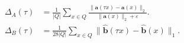 \begin{align}
\Delta_A(\tau)&=\frac{1}{|Q|}\!\sum_{x\in Q}\!\frac{\|\mathbf a(\tau x)-\mathbf a(x)\|_2}{\|\mathbf a(x)\|_2+\varepsilon}.
\tag{9}\label{eq:formal_perturbation_change}\\[1mm]
\Delta_B(\tau)&=\frac{1}{28|Q|}\sum_{x\in Q}\|\widehat{\mathbf b}(\tau x)-\widehat{\mathbf b}(x)\|_1.
\tag{10}\label{eq:semantic_perturbation_change}
\end{align}
